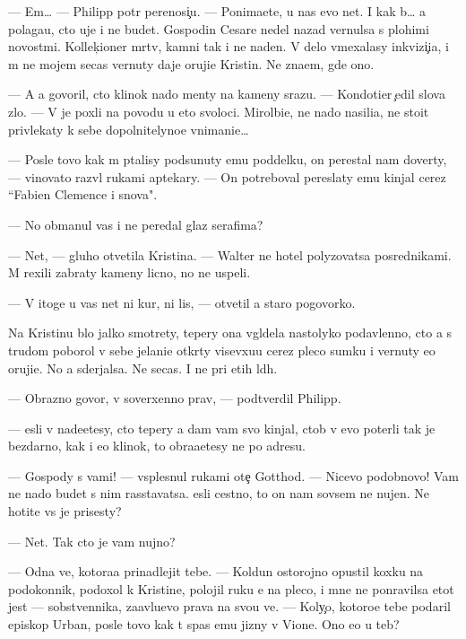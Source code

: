 \documentclass[10pt]{book}
\begin{document}
— Em… — Philipp pot{\e}r perenosi{\c}u. — Ponima{\y}ete, u nas {\y}evo net. I kak b{\yi}… {\y}a polaga{\y}u, cto uje i ne budet. Gospodin Cesare nedel{\io} nazad vernulsa s plohimi novost{\ia}mi. Kollek{\c}ioner m{\e}rtv, kamni tak i ne na{\y}den{\yi}. V delo vmexalasy inkvizi{\c}i{\y}a, i m{\yi} ne mojem se{\y}cas vernuty daje oruji{\y}e Kristin{\yi}. Ne zna{\y}em, gde ono.

— A {\y}a govoril, cto klinok nado men{\ia}ty na kameny srazu. — Kondotier {\c}edil slova zlo. — V{\yi} je poxli na povodu u eto{\y} svoloci. Mirol{\io}bi{\y}e, ne nado nasili{\y}a, ne stoit privlekaty k sebe dopolnitelyno{\y}e vnimani{\y}e…

— Posle tovo kak m{\yi} p{\yi}talisy podsunuty {\y}emu poddelku, on perestal nam dove\-r{\ia}ty, — vinovato razv{\e}l rukami aptekary. — On potreboval pereslaty {\y}emu kinjal cerez ``Fabien Clemence i s{\yi}nov{\y}a".

— No obmanul vas i ne peredal glaz serafima?

— Net, — gluho otvetila Kristina. — Walter ne hotel polyzovatsa posrednikami. M{\yi} rexili zabraty kameny licno, no ne uspeli.

— V itoge u vas net ni kur, ni lis{\yi}, — otvetil {\y}a staro{\y} pogovorko{\y}.

Na Kristinu b{\yi}lo jalko smotrety, tepery ona v{\yi}gl{\ia}dela nastolyko podavlenno{\y}, cto {\y}a s trudom poborol v sebe jelani{\y}e otkr{\yi}ty visevxu{\y}u cerez pleco sumku i vernuty {\y}e{\y}o oruji{\y}e. No {\y}a sderjalsa. Ne se{\y}cas. I ne pri etih l{\io}d{\ia}h.

— Obrazno go\-vo\-r{\ia}, v{\yi} soverxenno prav{\yi}, — podtverdil Philipp.

— {\Y}esli v{\yi} nade{\y}etesy, cto tepery {\y}a dam vam svo{\y} kinjal, ctob{\yi} v{\yi} {\y}evo poter{\ia}li tak je bezdarno, kak i {\y}e{\y}o klinok, to obra{\x}a{\y}etesy ne po adresu.

— Gospody s vami! — vsplesnul rukami ote{\c} Gotthod. — Nicevo podobnovo! Vam ne nado budet s nim rasstavatsa. {\Y}esli cestno, to on nam sovsem ne nujen. Ne hotite vs{\e} je prisesty?

— Net. Tak cto je vam nujno?

— Odna ve{\x}, kotora{\y}a prinadlejit tebe. — Koldun ostorojno opustil koxku na podokonnik, podoxol k Kristine, polojil ruku {\y}e{\y} na pleco, i mne ne ponravilsa etot jest — sobstvennika, za{\y}avl{\ia}{\y}u{\x}evo prava na svo{\y}u ve{\x}. — Koly{\c}o, kotoro{\y}e tebe podaril episkop Urban, posle tovo kak t{\yi} spas {\y}emu jizny v Vione. Ono {\y}e{\x}o u teb{\ia}?
\end{document}
